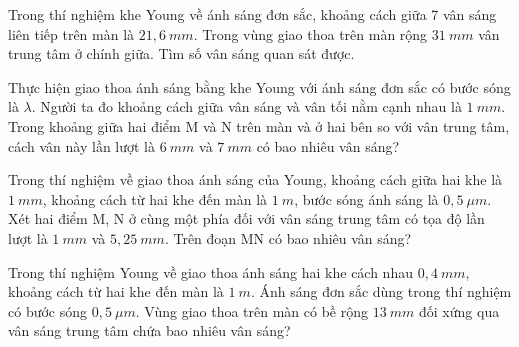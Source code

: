 
\begin{ex}
Trong thí nghiệm khe Young về ánh sáng đơn sắc, khoảng cách giữa 7 vân sáng liên tiếp trên màn là $21,6 ~mm$. Trong vùng giao thoa trên màn rộng $31 ~mm$ vân trung tâm ở chính giữa. Tìm số vân sáng quan sát được.
\end{ex} 
\begin{ex}
Thực hiện giao thoa ánh sáng bằng khe Young với ánh sáng đơn sắc có bước sóng là $\lambda$. Người ta đo khoảng cách giữa vân sáng và vân tối nằm cạnh nhau là $1 ~mm$. Trong khoảng giữa hai điểm M và N trên màn và ở hai bên so với vân trung tâm, cách vân này lần lượt là $6 ~mm$ và $7 ~mm$ có bao nhiêu vân sáng?
\end{ex} 
\begin{ex}
Trong thí nghiệm về giao thoa ánh sáng của Young, khoảng cách giữa hai khe là $1 \  mm$, khoảng cách từ hai khe đến màn là $1 \   m$, bước sóng ánh sáng là $0,5 \  \mu m$. Xét hai điểm M, N ở cùng một phía đối với vân sáng trung tâm có tọa độ lần lượt là $1 \  mm$ và $5,25 \  mm$. Trên đoạn MN có bao nhiêu vân sáng?
\loigiai{

}
\end{ex}
\begin{ex}
Trong thí nghiệm Young về giao thoa ánh sáng hai khe cách nhau $0,4\ mm$, khoảng cách từ hai khe đến màn là $1\ m$. Ánh sáng đơn sắc dùng trong thí nghiệm có bước sóng $0,5\ \mu m$. Vùng giao thoa trên màn có bề rộng $13\ mm$ đối xứng qua vân sáng trung tâm chứa bao nhiêu vân sáng?
\loigiai{

}
\end{ex}
